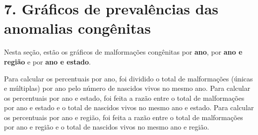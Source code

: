\documentclass[
]{article}
\begin{document}
\newpage

\hypertarget{gruxe1ficos-de-prevaluxeancias-das-anomalias-conguxeanitas}{%
\section{7. Gráficos de prevalências das anomalias
congênitas}\label{gruxe1ficos-de-prevaluxeancias-das-anomalias-conguxeanitas}}

Nesta seção, estão os gráficos de malformações congênitas por
\textbf{ano}, por \textbf{ano e região} e por \textbf{ano e estado}.

Para calcular os percentuais por ano, foi dividido o total de
malformações (únicas e múltiplas) por ano pelo número de nascidos vivos
no mesmo ano. Para calcular os percentuais por ano e estado, foi feita a
razão entre o total de malformações por ano e estado e o total de
nascidos vivos no mesmo ano e estado. Para calcular os percentuais por
ano e região, foi feita a razão entre o total de malformações por ano e
região e o total de nascidos vivos no mesmo ano e região.
\end{document}
